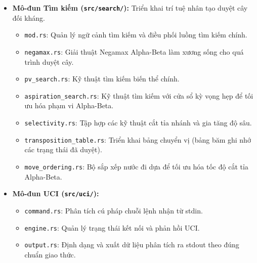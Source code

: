 \begin{itemize}
\begin{itemize}
        \item \texttt{piece\_material\_value.rs}: Định nghĩa giá trị vật chất của các quân cờ trong hai pha Middlegame và Endgame.
        \item \texttt{piece\_square\_tables.rs}: Bảng vị trí quân cờ quy định mức độ ưu tiên đứng của từng loại quân trên bàn cờ.
        \item \texttt{defender\_bonus.rs}: Điểm thưởng khi tồn tại quân cờ hỗ trợ bảo vệ lẫn nhau (đặc biệt là Sĩ, Tượng bảo vệ Tướng).
        \item \texttt{mobility\_tables.rs}: Bảng điểm thưởng theo mức độ cơ động (số nước đi khả dĩ) của Xe, Pháo, Mã.
    \end{itemize}
    \item \textbf{Mô-đun Tìm kiếm (\texttt{src/search/}):} Triển khai trí tuệ nhân tạo duyệt cây đối kháng.
    \begin{itemize}
        \item \texttt{mod.rs}: Quản lý ngữ cảnh tìm kiếm và điều phối luồng tìm kiếm chính.
        \item \texttt{negamax.rs}: Giải thuật Negamax Alpha-Beta làm xương sống cho quá trình duyệt cây.
        \item \texttt{pv\_search.rs}: Kỹ thuật tìm kiếm biến thể chính.
        \item \texttt{aspiration\_search.rs}: Kỹ thuật tìm kiếm với cửa sổ kỳ vọng hẹp để tối ưu hóa phạm vi Alpha-Beta.
        \item \texttt{selectivity.rs}: Tập hợp các kỹ thuật cắt tỉa nhánh và gia tăng độ sâu.
        \item \texttt{transposition\_table.rs}: Triển khai bảng chuyển vị (bảng băm ghi nhớ các trạng thái đã duyệt).
        \item \texttt{move\_ordering.rs}: Bộ sắp xếp nước đi dựa để tối ưu hóa tốc độ cắt tỉa Alpha-Beta.
    \end{itemize}
    \item \textbf{Mô-đun UCI (\texttt{src/uci/}):}
    \begin{itemize}
        \item \texttt{command.rs}: Phân tích cú pháp chuỗi lệnh nhận từ stdin.
        \item \texttt{engine.rs}: Quản lý trạng thái kết nối và phản hồi UCI.
        \item \texttt{output.rs}: Định dạng và xuất dữ liệu phân tích ra stdout theo đúng chuẩn giao thức.
    \end{itemize}
\end{itemize}

